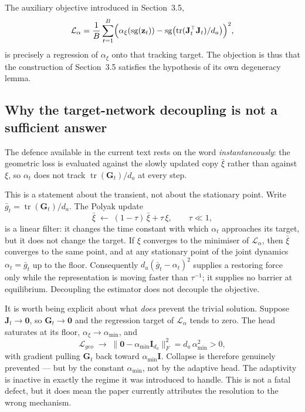 ﻿\documentclass{article}
\begin{document}
The auxiliary objective introduced in Section~3.5,
\[
  \mathcal{L}_\alpha
  =\frac{1}{B}\sum_{t=1}^{B}
  \Bigl(\alpha_\xi(\operatorname{sg}(\mathbf{z}_t))
        -\operatorname{sg}\bigl(\operatorname{tr}(\mathbf{J}_t^\top\mathbf{J}_t)/d_a\bigr)\Bigr)^2,
\]
is precisely a regression of $\alpha_\xi$ onto that tracking target. The
objection is thus that the construction of Section~3.5 satisfies the
hypothesis of its own degeneracy lemma.

\subsection{Why the target-network decoupling is not a sufficient answer}
\label{sec:addendum-polyak}

The defence available in the current text rests on the word
\emph{instantaneously}: the geometric loss is evaluated against the slowly
updated copy $\bar\xi$ rather than against $\xi$, so $\alpha_t$ does not track
$\operatorname{tr}(\mathbf{G}_t)/d_a$ at every step.

This is a statement about the transient, not about the stationary point. Write
$\bar g_t=\operatorname{tr}(\mathbf{G}_t)/d_a$. The Polyak update
\[
  \bar\xi\;\leftarrow\;(1-\tau)\,\bar\xi+\tau\,\xi,
  \qquad \tau\ll 1,
\]
is a linear filter: it changes the time constant with which $\alpha_t$
approaches its target, but it does not change the target. If $\xi$ converges
to the minimiser of $\mathcal{L}_\alpha$, then $\bar\xi$ converges to the same
point, and at any stationary point of the joint dynamics
$\alpha_t=\bar g_t$ up to the floor. Consequently
$d_a(\bar g_t-\alpha_t)^2$ supplies a restoring force only while the
representation is moving faster than $\tau^{-1}$; it supplies no barrier at
equilibrium. Decoupling the estimator does not decouple the objective.

It is worth being explicit about what \emph{does} prevent the trivial
solution. Suppose $\mathbf{J}_t\to\mathbf{0}$, so $\mathbf{G}_t\to\mathbf{0}$
and the regression target of $\mathcal{L}_\alpha$ tends to zero. The head
saturates at its floor, $\alpha_\xi\to\alpha_{\min}$, and
\[
  \mathcal{L}_{geo}\;\longrightarrow\;
  \bigl\|\mathbf{0}-\alpha_{\min}\mathbf{I}_{d_a}\bigr\|_F^2
  = d_a\,\alpha_{\min}^2>0,
\]
with gradient pulling $\mathbf{G}_t$ back toward $\alpha_{\min}\mathbf{I}$.
Collapse is therefore genuinely prevented --- but by the constant
$\alpha_{\min}$, not by the adaptive head. The adaptivity is inactive in
exactly the regime it was introduced to handle. This is not a fatal defect,
but it does mean the paper currently attributes the resolution to the wrong
mechanism.
\end{document}
